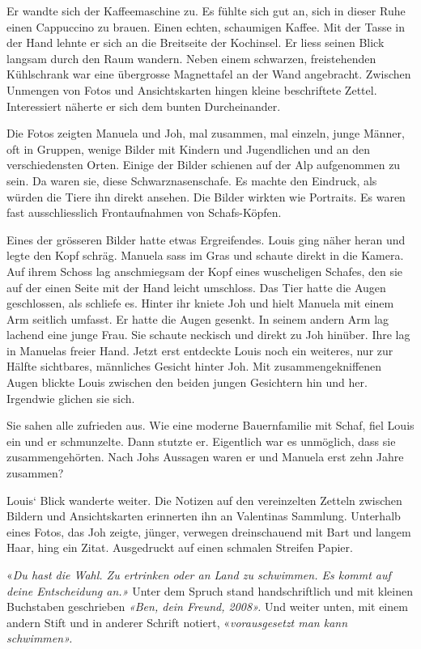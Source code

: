 Er wandte sich der Kaffeemaschine zu. Es fühlte sich gut an, sich in
dieser Ruhe einen Cappuccino zu brauen. Einen echten, schaumigen Kaffee.
Mit der Tasse in der Hand lehnte er sich an die Breitseite der
Kochinsel. Er liess seinen Blick langsam durch den Raum wandern. Neben
einem schwarzen, freistehenden Kühlschrank war eine übergrosse
Magnettafel an der Wand angebracht. Zwischen Unmengen von Fotos und
Ansichtskarten hingen kleine beschriftete Zettel. Interessiert näherte
er sich dem bunten Durcheinander.

Die Fotos zeigten Manuela und Joh, mal zusammen, mal einzeln, junge
Männer, oft in Gruppen, wenige Bilder mit Kindern und Jugendlichen und
an den verschiedensten Orten. Einige der Bilder schienen auf der Alp
aufgenommen zu sein. Da waren sie, diese Schwarznasenschafe. Es machte
den Eindruck, als würden die Tiere ihn direkt ansehen. Die Bilder
wirkten wie Portraits. Es waren fast ausschliesslich Frontaufnahmen von
Schafs-Köpfen.

Eines der grösseren Bilder hatte etwas Ergreifendes. Louis ging näher
heran und legte den Kopf schräg. Manuela sass im Gras und schaute direkt
in die Kamera. Auf ihrem Schoss lag anschmiegsam der Kopf eines
wuscheligen Schafes, den sie auf der einen Seite mit der Hand leicht
umschloss. Das Tier hatte die Augen geschlossen, als schliefe es. Hinter
ihr kniete Joh und hielt Manuela mit einem Arm seitlich umfasst. Er
hatte die Augen gesenkt. In seinem andern Arm lag lachend eine junge
Frau. Sie schaute neckisch und direkt zu Joh hinüber. Ihre lag in
Manuelas freier Hand. Jetzt erst entdeckte Louis noch ein weiteres, nur
zur Hälfte sichtbares, männliches Gesicht hinter Joh. Mit
zusammengekniffenen Augen blickte Louis zwischen den beiden jungen
Gesichtern hin und her. Irgendwie glichen sie sich.

Sie sahen alle zufrieden aus. Wie eine moderne Bauernfamilie mit Schaf,
fiel Louis ein und er schmunzelte. Dann stutzte er. Eigentlich war es
unmöglich, dass sie zusammengehörten. Nach Johs Aussagen waren er und
Manuela erst zehn Jahre zusammen?

Louis` Blick wanderte weiter. Die Notizen auf den vereinzelten Zetteln
zwischen Bildern und Ansichtskarten erinnerten ihn an Valentinas
Sammlung. Unterhalb eines Fotos, das Joh zeigte, jünger, verwegen
dreinschauend mit Bart und langem Haar, hing ein Zitat. Ausgedruckt auf
einen schmalen Streifen Papier.

«\emph{Du hast die Wahl. Zu ertrinken oder an Land zu schwimmen. Es
kommt auf deine Entscheidung an.»} Unter dem Spruch stand
handschriftlich und mit kleinen Buchstaben geschrieben \emph{«Ben, dein
Freund, 2008».} Und weiter unten, mit einem andern Stift und in anderer
Schrift notiert, «\emph{vorausgesetzt man kann schwimmen».}

